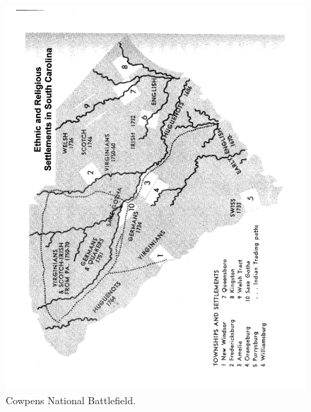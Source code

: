 \begin{figure}[h]
	\singlespacing
	\begin{center}
	  \includegraphics[width=6in]{gfx/rauch_battle_2007_02_p19}
	\end{center}
	\caption{Cowpens National Battlefield.}
	\label{cowppark97}
\end{figure}
\lipsum[6]

